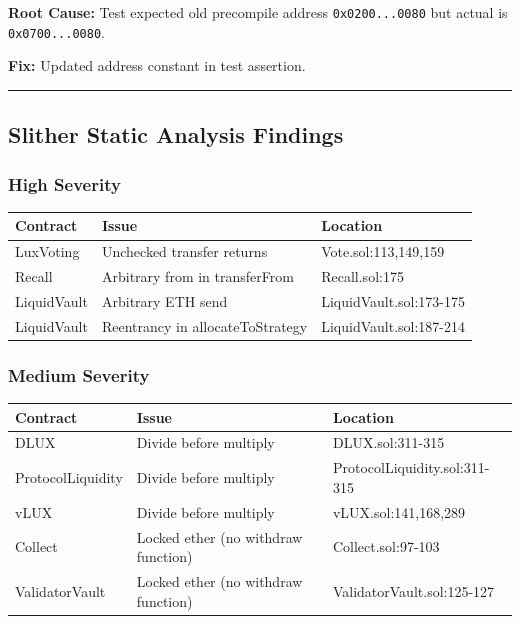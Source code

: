 \documentclass[
]{article}
\newcounter{none} %
\begin{document}
\textbf{Root Cause:} Test expected old precompile address
\texttt{0x0200...0080} but actual is \texttt{0x0700...0080}.

\textbf{Fix:} Updated address constant in test assertion.

\begin{center}\rule{0.5\linewidth}{0.5pt}\end{center}

\subsection{Slither Static Analysis
Findings}\label{slither-static-analysis-findings}

\subsubsection{High Severity}\label{high-severity}

{\def\LTcaptype{none} %
\begin{longtable}[]{@{}lll@{}}
\toprule\noalign{}
Contract & Issue & Location \\
\midrule\noalign{}
\endhead
\bottomrule\noalign{}
\endlastfoot
LuxVoting & Unchecked transfer returns & Vote.sol:113,149,159 \\
Recall & Arbitrary from in transferFrom & Recall.sol:175 \\
LiquidVault & Arbitrary ETH send & LiquidVault.sol:173-175 \\
LiquidVault & Reentrancy in allocateToStrategy &
LiquidVault.sol:187-214 \\
\end{longtable}
}

\subsubsection{Medium Severity}\label{medium-severity}

{\def\LTcaptype{none} %
\begin{longtable}[]{@{}lll@{}}
\toprule\noalign{}
Contract & Issue & Location \\
\midrule\noalign{}
\endhead
\bottomrule\noalign{}
\endlastfoot
DLUX & Divide before multiply & DLUX.sol:311-315 \\
ProtocolLiquidity & Divide before multiply &
ProtocolLiquidity.sol:311-315 \\
vLUX & Divide before multiply & vLUX.sol:141,168,289 \\
Collect & Locked ether (no withdraw function) & Collect.sol:97-103 \\
ValidatorVault & Locked ether (no withdraw function) &
ValidatorVault.sol:125-127 \\
\end{longtable}
}
\end{document}
